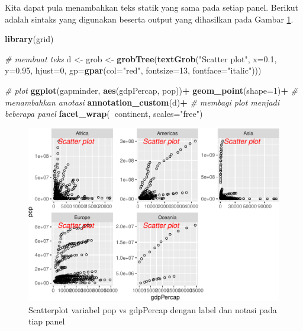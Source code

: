 \documentclass[]{book}
\newenvironment{Shaded}{\begin{snugshade}}{\end{snugshade}}
\newcommand{\KeywordTok}[1]{\textcolor[rgb]{0.13,0.29,0.53}{\textbf{#1}}}
\newcommand{\DataTypeTok}[1]{\textcolor[rgb]{0.13,0.29,0.53}{#1}}
\newcommand{\DecValTok}[1]{\textcolor[rgb]{0.00,0.00,0.81}{#1}}
\newcommand{\FloatTok}[1]{\textcolor[rgb]{0.00,0.00,0.81}{#1}}
\newcommand{\StringTok}[1]{\textcolor[rgb]{0.31,0.60,0.02}{#1}}
\newcommand{\CommentTok}[1]{\textcolor[rgb]{0.56,0.35,0.01}{\textit{#1}}}
\newcommand{\OperatorTok}[1]{\textcolor[rgb]{0.81,0.36,0.00}{\textbf{#1}}}
\newcommand{\NormalTok}[1]{#1}
\begin{document}
Kita dapat pula menambahkan teks statik yang sama pada setiap panel.
Berikut adalah sintaks yang digunakan beserta output yang dihasilkan
pada Gambar \ref{fig:gglabel4}.

\begin{Shaded}
\begin{Highlighting}[]
\KeywordTok{library}\NormalTok{(grid)}

\CommentTok{# membuat teks}
\NormalTok{d <-}\StringTok{ }\NormalTok{grob <-}\StringTok{ }\KeywordTok{grobTree}\NormalTok{(}\KeywordTok{textGrob}\NormalTok{(}\StringTok{"Scatter plot"}\NormalTok{, }\DataTypeTok{x=}\FloatTok{0.1}\NormalTok{,  }\DataTypeTok{y=}\FloatTok{0.95}\NormalTok{, }\DataTypeTok{hjust=}\DecValTok{0}\NormalTok{,}
  \DataTypeTok{gp=}\KeywordTok{gpar}\NormalTok{(}\DataTypeTok{col=}\StringTok{"red"}\NormalTok{, }\DataTypeTok{fontsize=}\DecValTok{13}\NormalTok{, }\DataTypeTok{fontface=}\StringTok{"italic"}\NormalTok{)))}

\CommentTok{# plot}
\KeywordTok{ggplot}\NormalTok{(gapminder, }\KeywordTok{aes}\NormalTok{(gdpPercap, pop))}\OperatorTok{+}
\StringTok{  }\KeywordTok{geom_point}\NormalTok{(}\DataTypeTok{shape=}\DecValTok{1}\NormalTok{)}\OperatorTok{+}
\StringTok{  }\CommentTok{# menambahkan anotasi}
\StringTok{  }\KeywordTok{annotation_custom}\NormalTok{(d)}\OperatorTok{+}
\StringTok{  }\CommentTok{# membagi plot menjadi beberapa panel}
\StringTok{  }\KeywordTok{facet_wrap}\NormalTok{(}\OperatorTok{~}\NormalTok{continent, }\DataTypeTok{scales=}\StringTok{"free"}\NormalTok{)}
\end{Highlighting}
\end{Shaded}

\begin{figure}

{\centering \includegraphics[width=0.7\linewidth]{EnvStat_files/figure-latex/gglabel4-1} 

}

\caption{Scatterplot variabel pop vs gdpPercap dengan label dan notasi pada tiap panel}\label{fig:gglabel4}
\end{figure}
\end{document}
